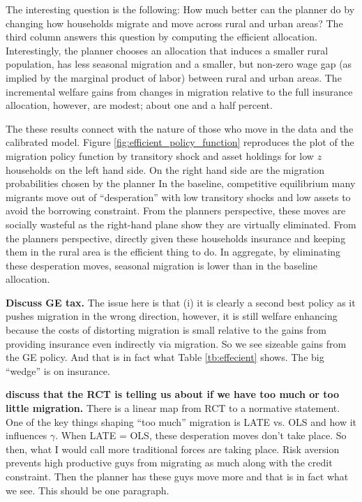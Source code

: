 \documentclass[12pt,pdftex]{article}
\begin{document}
\begin{onehalfspacing}
The interesting question is the following: How much better can the planner do by changing how households migrate and move across rural and urban areas? The third column answers this question by computing the efficient allocation. Interestingly, the planner chooses an allocation that induces a smaller rural population, has less seasonal migration and a smaller, but non-zero wage gap (as implied by the marginal product of labor) between rural and urban areas. The incremental welfare gains from changes in migration relative to the full insurance allocation, however, are modest; about one and a half percent. 

The these results connect with the nature of those who move in the data and the calibrated model. Figure \ref{fig:efficient_policy_function} reproduces the plot of the migration policy function by transitory shock and asset holdings for low $z$ households on the left hand side. On the right hand side are the migration probabilities chosen by the planner  In the baseline, competitive equilibrium many migrants move out of ``desperation'' with low transitory shocks and low assets to avoid the borrowing constraint. From the planners perspective, these moves are socially wasteful as the right-hand plane show they are virtually eliminated. From the planners perspective, directly given these households insurance and keeping them in the rural area is the efficient thing to do. In aggregate, by eliminating these desperation moves, seasonal migration is lower than in the baseline allocation. 



\textbf{Discuss GE tax.} The issue here is that (i) it is clearly a second best policy as it pushes migration in the wrong direction, however, it is still welfare enhancing because the costs of distorting migration is small relative to the gains from providing insurance even indirectly via migration. So we see sizeable gains from the GE policy. And that is in fact what Table \ref{tb:effecient} shows. The big ``wedge'' is on insurance.

\textbf{discuss that the RCT is telling us about if we have too much or too little migration.} There is a linear map from RCT to a normative statement. One of the key things shaping ``too much'' migration is LATE vs. OLS and how it influences $\gamma$. When LATE = OLS, these desperation moves don't take place. So then, what I would call more traditional forces are taking place. Risk aversion prevents high productive guys from migrating as much along with the credit constraint. Then the planner has these guys move more and that is in fact what we see. This should be one paragraph.


\end{onehalfspacing}
\end{document}
